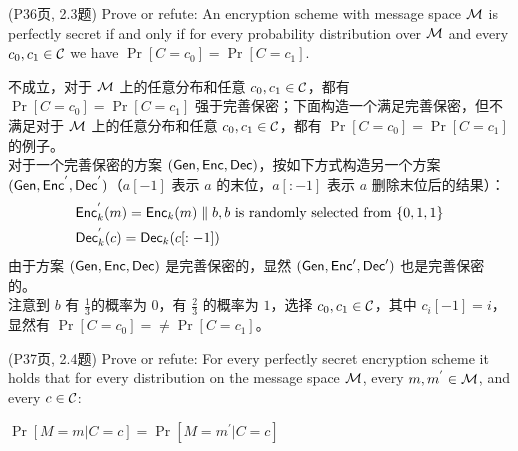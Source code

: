 \begin{questions}
    \question (P36页, 2.3题) Prove or refute: An encryption scheme with message space $\mathcal{M}$ is perfectly secret if and only if for every probability distribution over $\mathcal{M}$ and every $c_0,c_1\in\mathcal{C}$ we have $\Pr[C=c_0]=\Pr[C=c_1]$.

        \begin{solution}
            \newline
            不成立，对于 $\mathcal{M}$ 上的任意分布和任意 $c_0,c_1\in\mathcal{C}$，都有 $\Pr[C=c_0]=\Pr[C=c_1]$ 强于完善保密；下面构造一个满足完善保密，但不满足对于 $\mathcal{M}$ 上的任意分布和任意 $c_0,c_1\in\mathcal{C}$，都有 $\Pr[C=c_0]=\Pr[C=c_1]$ 的例子。\\
            对于一个完善保密的方案 $(\mathsf{Gen},\mathsf{Enc},\mathsf{Dec})$，按如下方式构造另一个方案 $(\mathsf{Gen},\mathsf{Enc}^{'},\mathsf{Dec}^{'})$（$a[-1]$ 表示 $a$ 的末位，$a[:-1]$ 表示 $a$ 删除末位后的结果）：
            \begin{equation}
                \begin{aligned}
                    & \skcenc_k^{'}(m)=\skcenc_k(m) \parallel b,b\ \text{is randomly selected from}\ \set{0,1,1}\\
                    & \skcdec_k^{'}(c)=\skcdec_k(c[:-1])
                \end{aligned}
            \end{equation}
            由于方案 $(\mathsf{Gen},\mathsf{Enc},\mathsf{Dec})$ 是完善保密的，显然 $(\mathsf{Gen},\mathsf{Enc}',\mathsf{Dec}')$ 也是完善保密的。\\
            注意到 $b$ 有 $\frac{1}{3}$的概率为 $0$，有 $\frac{2}{3}$ 的概率为 $1$，选择 $c_0,c_1\in\mathcal{C}$，其中 $c_i[-1]=i$，显然有 $\Pr[C=c_0]=\neq\Pr[C=c_1]$。
        \end{solution}

    \question (P37页, 2.4题) Prove or refute: For every perfectly secret encryption scheme it holds that for every distribution on the message space $\mathcal{M}$, every $m,m^{'}\in\mathcal{M}$, and every $c\in\mathcal{C}$:

        \begin{center} $\Pr[M=m|C=c]=\Pr[M=m^{'}|C=c]$ \end{center}


\end{questions}

